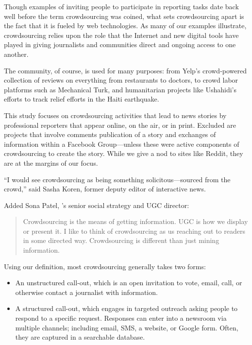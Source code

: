 \begin{itemize}
Though examples of inviting people to participate in reporting tasks date back well before the term crowdsourcing was coined, what sets crowdsourcing apart is the fact that it is fueled by web technologies. As many of our examples illustrate, crowdsourcing relies upon the role that the Internet and new digital tools have played in giving journalists and communities direct and ongoing access to one another.

The community, of course, is used for many purposes: from Yelp’s crowd-powered collection of reviews on everything from restaurants to doctors, to crowd labor platforms such as Mechanical Turk, and humanitarian projects like Ushahidi’s efforts to track relief efforts in the Haiti earthquake. 

This study focuses on crowdsourcing activities that lead to news stories by professional reporters that appear online, on the air, or in print.  Excluded are projects that involve comments  publication of a story and exchanges of information within a Facebook Group---unless these were active components of crowdsourcing to create the story. While we give a nod to sites like Reddit, they are at the margins of our focus.\autocite{text}

 ``I would see crowdsourcing as being something solicitous---sourced from the crowd,'' said Sasha Koren, former  deputy editor of interactive news.\autocite{Koren}
 
Added Sona Patel, ’s senior social strategy and UGC director: 

\begin{quote}Crowdsourcing is the means of getting information. UGC is how we display or present it. I like to think of crowdsourcing as us reaching out to readers in some directed way. Crowdsourcing is different than just mining information.\autocite{Patel}\end{quote}

Using our definition, most crowdsourcing generally takes two forms:
\begin{itemize}
\item An unstructured call-out, which is an open invitation to vote, email, call, or otherwise contact a journalist with information.
\item A structured call-out, which engages in targeted outreach asking people to respond to a specific request. Responses can enter into a newsroom via multiple channels; including email, SMS, a website, or Google form. Often, they are captured in a searchable database.


\end{itemize}
\end{itemize}
